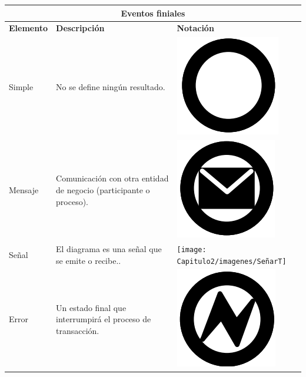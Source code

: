 \begin{table}[H]
	\centering
	\begin{tabular}{ |p{2cm}|p{9.5cm}|p{1.7cm} |  }
		\hline
		\multicolumn{3}{|c|}{Eventos finiales} \\
		\hline
		\textbf{Elemento}& \textbf{Descripción}&\textbf{Notación}\\
		
		\hline
		{\small Simple } & {\small No se define ningún resultado. } & \vspace{0.5mm} \hspace{2mm} \includegraphics[scale=0.2]{Capitulo2/imagenes/BasicoF} \\
		
		\hline
		{\small Mensaje } & {\small Comunicación con otra entidad de negocio (participante o proceso). } & \vspace{2mm} \hspace{2mm} \includegraphics[scale=0.2]{Capitulo2/imagenes/MensajeF}\\
		
		\hline
		{\small Señal } & {\small El diagrama es una señal que se emite o recibe.. } & \vspace{1mm} \hspace{2mm} \texttt{[image: Capitulo2/imagenes/SeñarT]}\\
		
		\hline		
		{\small Error } & {\small  Un estado final que interrumpirá el proceso de transacción.}  &  \vspace{1mm} \hspace{2mm} \includegraphics[scale=0.2]{Capitulo2/imagenes/ErrorF}\\ 
		

\end{tabular}
\end{table}
